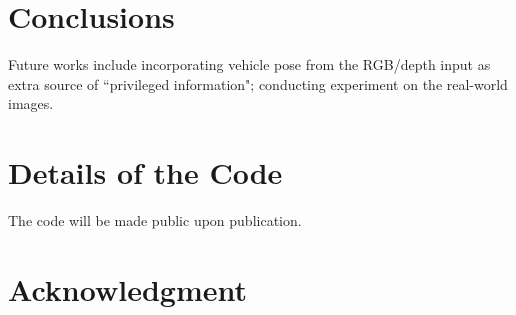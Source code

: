 \documentclass[10pt,twocolumn,letterpaper]{article}
\begin{document}
\section{Conclusions}

Future works include incorporating vehicle pose from the RGB/depth input as extra source of ``privileged information"; conducting experiment on the real-world images.

\section*{Details of the Code}
 The code will be made public upon publication.

\section*{Acknowledgment}

{\small


}
\end{document}
